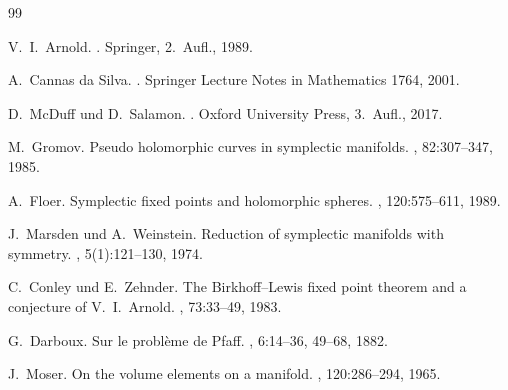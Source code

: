 \documentclass[12pt,a4paper]{amsart}
\theoremstyle{definition}
\begin{document}
\begin{thebibliography}{99}

V.~I.~Arnold.
.
\newblock Springer, 2.~Aufl., 1989.

A.~Cannas da Silva.
.
\newblock Springer Lecture Notes in Mathematics 1764, 2001.

D.~McDuff und D.~Salamon.
.
\newblock Oxford University Press, 3.~Aufl., 2017.

M.~Gromov.
\newblock Pseudo holomorphic curves in symplectic manifolds.
, 82:307--347, 1985.

A.~Floer.
\newblock Symplectic fixed points and holomorphic spheres.
, 120:575--611, 1989.

J.~Marsden und A.~Weinstein.
\newblock Reduction of symplectic manifolds with symmetry.
, 5(1):121--130, 1974.

C.~Conley und E.~Zehnder.
\newblock The Birkhoff--Lewis fixed point theorem and a conjecture of V.~I.~Arnold.
, 73:33--49, 1983.

G.~Darboux.
\newblock Sur le probl\`{e}me de Pfaff.
, 6:14--36, 49--68, 1882.

J.~Moser.
\newblock On the volume elements on a manifold.
, 120:286--294, 1965.

\end{thebibliography}
\end{document}
